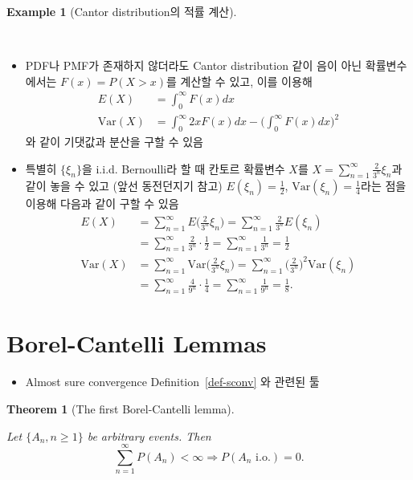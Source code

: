 \documentclass[
  13pt,
  letterpaper,
  DIV=11,
  numbers=noendperiod]{scrreprt}
\providecommand{\tightlist}{%
  \setlength{\itemsep}{0pt}\setlength{\parskip}{0pt}}\usepackage{longtable,booktabs,array}
\theoremstyle{definition}
\theoremstyle{plain}
\theoremstyle{definition}
\theoremstyle{plain}
\newtheorem{theorem}{Theorem}[chapter]
\theoremstyle{plain}
\theoremstyle{definition}
\newtheorem{example}{Example}[chapter]
\theoremstyle{remark}
\begin{document}
\begin{example}[Cantor distribution의 적률
계산]\protect\hypertarget{exm-cantorexp}{}\label{exm-cantorexp}

~

\begin{itemize}
\item
  PDF나 PMF가 존재하지 않더라도 Cantor distribution 같이 음이 아닌
  확률변수에서는 \(F(x) = P(X>x)\)를 계산할 수 있고, 이를 이용해 \[
  \begin{align*}
  E(X) &= \int_0^{\infty} F(x) dx\\
  \text{Var} (X) &= \int_0^{\infty} 2x F(x) dx - \Big( \int_0^{\infty}F(x) dx \Big)^2
  \end{align*}
  \] 와 같이 기댓값과 분산을 구할 수 있음
\item
  특별히 \(\{\xi_n\}\)을 i.i.d. Bernoulli라 할 때 칸토르 확률변수
  \(X\)를 \(X=\sum_{n=1}^{\infty}\frac{2}{3^n}\xi_n\)과 같이 놓을 수
  있고 (앞선 동전던지기 참고) \(E(\xi_n)=\frac{1}{2}\),
  \(\text{Var}(\xi_n) = \frac{1}{4}\)라는 점을 이용해 다음과 같이 구할
  수 있음 \[
  \begin{align*}
  E(X) &= \sum_{n=1}^{\infty} E\Big( \frac{2}{3^n} \xi_n \Big)= \sum_{n=1}^{\infty}  \frac{2}{3^n} E(\xi_n)\\&= \sum_{n=1}^{\infty} \frac{2}{3^n }\cdot \frac{1}{2}= \sum_{n=1}^{\infty} \frac{1}{3^n} = \frac{1}{2}\\
  \text{Var}(X) &= \sum_{n=1}^{\infty} \text{Var}\Big( \frac{2}{3^n} \xi_n \Big)= \sum_{n=1}^{\infty}  \Big(\frac{2}{3^n}\Big)^2 \text{Var}(\xi_n)\\&= \sum_{n=1}^{\infty} \frac{4}{9^n }\cdot \frac{1}{4}= \sum_{n=1}^{\infty} \frac{1}{9^n} = \frac{1}{8}.
  \end{align*}
  \]
\end{itemize}

\end{example}

\section{Borel-Cantelli Lemmas}\label{borel-cantelli-lemmas}

\begin{itemize}
\tightlist
\item
  Almost sure convergence Definition~\ref{def-sconv} 와 관련된 툴
\end{itemize}

\begin{theorem}[The first Borel-Cantelli
lemma]\protect\hypertarget{thm-firstborelcantelli}{}\label{thm-firstborelcantelli}

Let \(\{A_n, n \geq 1\}\) be arbitrary events. Then \[
\sum_{n=1}^{\infty}P(A_n) < \infty \Longrightarrow P(A_n \text{ i.o.})=0.
\]

\end{theorem}
\end{document}
